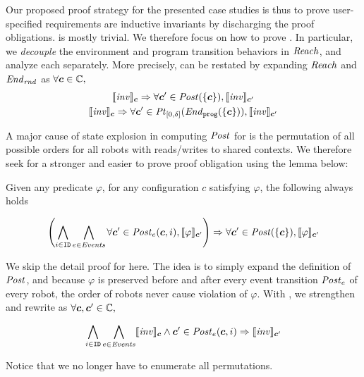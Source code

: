Our proposed proof strategy for the presented case studies is thus to prove
user-specified requirements are inductive invariants by discharging the proof obligations.
 is mostly trivial.
We therefore focus on how to prove .
In particular, we \emph{decouple} the environment and program transition behaviors in $\mathit{Reach}$,
and analyze each separately.
More precisely,  can be restated by expanding $\mathit{Reach}$ and $\mathit{End}_\mathit{rnd}$ as $\forall \mathit{\boldsymbol{c}} \in \mathbb{C},$
\begin{gather}
\llbracket\mathit{inv}\rrbracket_{\mathit{\boldsymbol{c}}} \Rightarrow \forall \mathit{\boldsymbol{c}}' \in \mathit{Post}(\left\{\mathit{\boldsymbol{c}}\right\}), \llbracket\mathit{inv}\rrbracket_{\mathit{\boldsymbol{c}}'}\label{po:ind-hyp-prog}\\
\llbracket\mathit{inv}\rrbracket_{\mathit{\boldsymbol{c}}} \Rightarrow \forall \mathit{\boldsymbol{c}}' \in \mathit{Pt}_{[0,\delta]}(\mathit{End}_{\mathtt{prog}}(\left\{\mathit{\boldsymbol{c}}\right\})), \llbracket\mathit{inv}\rrbracket_{\mathit{\boldsymbol{c}}'}\label{po:ind-hyp-env}
\end{gather}

A major cause of state explosion in computing $\mathit{Post}$ for 
is the permutation of all possible orders for all robots
with reads/writes to shared contexts.
We therefore seek for a stronger and easier to prove proof obligation using the lemma below:
\begin{lemma}
   \label{lem:noninter}
Given any predicate $\varphi$,
for any configuration $c$ satisfying $\varphi$, the following always holds
\begin{small}
\[
\left(\bigwedge_{i\in \texttt{ID}}\bigwedge_{e \in \mathit{Events}} \forall \mathit{\boldsymbol{c}}' \in \mathit{Post}_e(\mathit{\boldsymbol{c}}, i), \llbracket\varphi\rrbracket_{\mathit{\boldsymbol{c}}'}\right)
    \Rightarrow \forall \mathit{\boldsymbol{c}}' \in \mathit{Post}(\left\{\mathit{\boldsymbol{c}}\right\}), \llbracket\varphi\rrbracket_{\mathit{\boldsymbol{c}}'}
\]
\end{small}

\end{lemma}
We skip the detail proof for  here.
The idea is to simply expand the definition of $\mathit{Post}$,
and because $\varphi$ is preserved before and after every event transition $\mathit{Post}_e$ of every robot,
the order of robots never cause violation of $\varphi$.
With , we strengthen and rewrite  as $\forall \mathit{\boldsymbol{c}}, \mathit{\boldsymbol{c}}' \in \mathbb{C},$
\begin{small}
\begin{equation}
\bigwedge_{i\in \texttt{ID}}\bigwedge_{e \in \mathit{Events}} \llbracket\mathit{inv}\rrbracket_{\mathit{\boldsymbol{c}}} \land \mathit{\boldsymbol{c}}' \in \mathit{Post}_e(\mathit{\boldsymbol{c}}, i)
    \Rightarrow \llbracket\mathit{inv}\rrbracket_{\mathit{\boldsymbol{c}}'}\label{po:ind-hyp-event}
\end{equation}
\end{small}%
Notice that we no longer have to enumerate all permutations.

